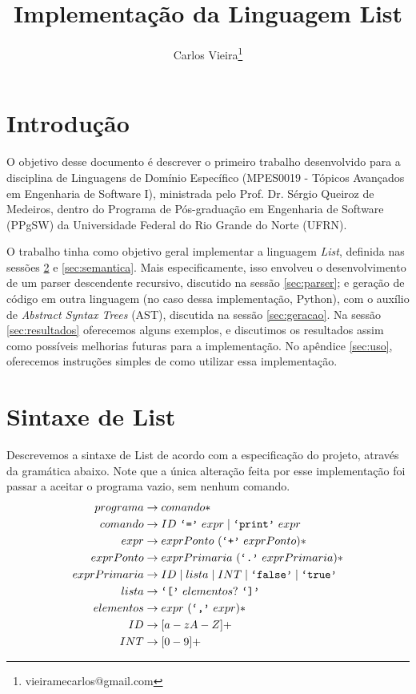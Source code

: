 \documentclass{article}
\title{Implementação da Linguagem List}
\author{Carlos Vieira\thanks{vieiramecarlos@gmail.com}}
\newcommand{\literal}[1]{\text{\texttt{`#1'}}}
\newcommand{\tsp}{\text{ }}
\begin{document}
\maketitle

\section{Introdução}
O objetivo desse documento é descrever o primeiro trabalho desenvolvido para a disciplina de Linguagens de Domínio Específico (MPES0019 - Tópicos Avançados em Engenharia de Software I), ministrada pelo Prof. Dr. Sérgio Queiroz de Medeiros, dentro do Programa de Pós-graduação em Engenharia de Software (PPgSW) da Universidade Federal do Rio Grande do Norte (UFRN).

O trabalho tinha como objetivo geral implementar a linguagem \textit{List}, definida nas sessões \ref{sec:sintaxe} e \ref{sec:semantica}. Mais especificamente, isso envolveu o desenvolvimento de um parser descendente recursivo, discutido na sessão \ref{sec:parser}; e geração de código em outra linguagem (no caso dessa implementação, Python), com o auxílio de \textit{Abstract Syntax Trees} (AST), discutida na sessão \ref{sec:geracao}. Na sessão \ref{sec:resultados} oferecemos alguns exemplos, e discutimos os resultados assim como possíveis melhorias futuras para a implementação. No apêndice \ref{sec:uso}, oferecemos instruções simples de como utilizar essa implementação.

\section{Sintaxe de List}
\label{sec:sintaxe}
Descrevemos a sintaxe de List de acordo com a especificação do projeto, através da gramática abaixo. Note que a única alteração feita por esse implementação foi passar a aceitar o programa vazio, sem nenhum comando.
\begin{align*}
programa &\rightarrow comando*\\
comando &\rightarrow ID \tsp \literal{=} \tsp expr \mid \literal{print} \tsp expr\\
expr &\rightarrow exprPonto \tsp (\literal{+} \tsp exprPonto)*\\
exprPonto &\rightarrow exprPrimaria \tsp (\literal{.} \tsp exprPrimaria)*\\
exprPrimaria &\rightarrow ID \mid lista \mid INT \mid \literal{false} \mid \literal{true}\\
lista &\rightarrow \literal{[} \tsp elementos? \tsp \literal{]}\\
elementos &\rightarrow expr \tsp (\literal{,} \tsp expr)* \\
ID &\rightarrow [a-zA-Z]+\\
INT &\rightarrow [0-9]+
\end{align*}
\end{document}
